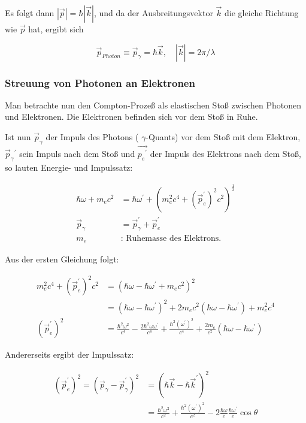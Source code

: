 \documentclass[10pt, letterpaper]{article}
\begin{document}
Es folgt dann $|\vec{p}|=\hbar|\vec{k}|$, und da der Ausbreitungsvektor $\vec{k}$ die gleiche Richtung wie $\vec{p}$ hat, ergibt sich

$$
\vec{p}_{P h o t o n} \equiv \vec{p}_{\gamma}=\hbar \vec{k}, \quad|\vec{k}|=2 \pi / \lambda
$$

\subsubsection*{Streuung von Photonen an Elektronen}
Man betrachte nun den Compton-Prozeß als elastischen Stoß zwischen Photonen und Elektronen. Die Elektronen befinden sich vor dem Stoß in Ruhe.

Ist nun $\vec{p}_{\gamma}$ der Impuls des Photons ( $\gamma$-Quants) vor dem Stoß mit dem Elektron, $\vec{p}_{\gamma}{ }^{\prime}$ sein Impuls nach dem Stoß und $\overrightarrow{p_{e}{ }^{\prime}}$ der Impuls des Elektrons nach dem Stoß, so lauten Energie- und Impulssatz:

$$
\begin{aligned}
\hbar \omega+m_{e} c^{2} & =\hbar \omega^{\prime}+\left(m_{e}^{2} c^{4}+\left(\vec{p}_{e}^{\prime}\right)^{2} c^{2}\right)^{\frac{1}{2}} \\
\vec{p}_{\gamma} & =\vec{p}_{\gamma}^{\prime}+\vec{p}_{e}^{\prime} \\
m_{e} & : \text { Ruhemasse des Elektrons. }
\end{aligned}
$$

Aus der ersten Gleichung folgt:

$$
\begin{aligned}
m_{e}^{2} c^{4}+\left(\vec{p}_{e}^{\prime}\right)^{2} c^{2} & =\left(\hbar \omega-\hbar \omega^{\prime}+m_{e} c^{2}\right)^{2} \\
& =\left(\hbar \omega-\hbar \omega^{\prime}\right)^{2}+2 m_{e} c^{2}\left(\hbar \omega-\hbar \omega^{\prime}\right)+m_{e}^{2} c^{4} \\
\left(\vec{p}_{e}^{\prime}\right)^{2} & =\frac{\hbar^{2} \omega^{2}}{c^{4}}-\frac{2 \hbar^{2} \omega \omega^{\prime}}{c^{4}}+\frac{\hbar^{2}\left(\omega^{\prime}\right)^{2}}{c^{4}}+\frac{2 m_{e}}{c^{2}}\left(\hbar \omega-\hbar \omega^{\prime}\right)
\end{aligned}
$$

Andererseits ergibt der Impulssatz:

$$
\begin{aligned}
\left(\vec{p}_{e}^{\prime}\right)^{2}=\left(\vec{p}_{\gamma}-\vec{p}_{\gamma}^{\prime}\right)^{2} & =\left(\hbar \vec{k}-\hbar \vec{k}^{\prime}\right)^{2} \\
& =\frac{\hbar^{2} \omega^{2}}{c^{2}}+\frac{\hbar^{2}\left(\omega^{\prime}\right)^{2}}{c^{2}}-2 \frac{\hbar \omega}{c} \frac{\hbar \omega^{\prime}}{c} \cos \theta
\end{aligned}
$$
\end{document}
